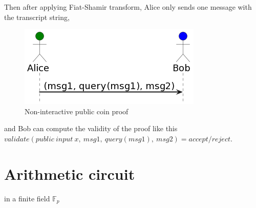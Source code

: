 Then after applying Fiat-Shamir transform, Alice only sends one message with
the transcript string,
\begin{figure}[h]
    \centering
    \includegraphics[scale=0.6]{assets/images/non_interactive_coin.png}
    \caption{Non-interactive public coin proof}
    \label{fig:non_interactive_coin}
    \vspace{0.5cm}
\end{figure}
and Bob can compute the validity of the proof like this
$validate(public\:input\:x,\:msg1,\:query(msg1),\:msg2) = accept/reject$.

\section{Arithmetic circuit}
in a finite field $\mathbb{F}_p$




